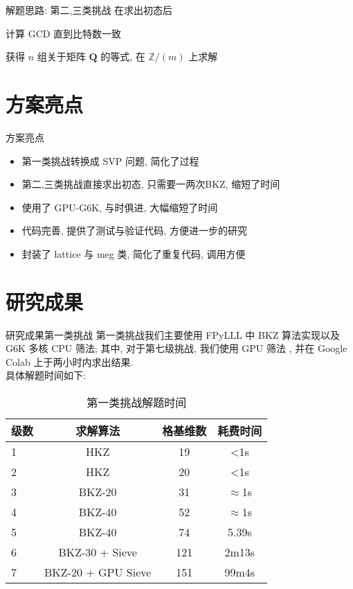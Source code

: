 \documentclass[10pt,compress]{beamer}
\newcommand{\Z}{\ensuremath{\mathbb{Z}}\xspace}
\newcommand{\mat}[1]{\mathbf{#1}\xspace}
\begin{document}
\begin{frame}{解题思路: 第二,三类挑战}
  在求出初态后 \\
  \begin{description}
    \pause
    \item[求模数 $m$] 计算 GCD 直到比特数一致
    \pause 
    \item[求系数 $c_i$] 获得 $n$ 组关于矩阵 $\mat{Q}$ 的等式, 在 $\Z / (m)$ 上求解
  \end{description}
\end{frame}



\section{方案亮点}

\begin{frame}{方案亮点}
  \begin{itemize}
    \pause
    \item 第一类挑战转换成 SVP 问题, 简化了过程
    \pause
    \item 第二,三类挑战直接求出初态, 只需要一两次BKZ, 缩短了时间
    \pause
    \item 使用了 GPU-G6K, 与时俱进, 大幅缩短了时间
    \pause
    \item 代码完善, 提供了测试与验证代码, 方便进一步的研究
    \pause
    \item 封装了 lattice 与 meg 类, 简化了重复代码, 调用方便
  \end{itemize}
\end{frame}



\section{研究成果}

\begin{frame}{研究成果}{第一类挑战}
  第一类挑战我们主要使用 FPyLLL \cite{fpylll} 中 BKZ 算法实现以及 G6K \cite{Albrecht2019a} 多核 CPU 筛法;
  \pause
  其中, 对于第七级挑战, 我们使用 GPU 筛法 \cite{Ducas2021}, 并在 Google Colab 上于两小时内求出结果. \\
  \pause
  具体解题时间如下:
  \begin{table}
    \begin{tabular}{l | c | c | c }
      级数 &求解算法 &格基维数 &耗费时间 \\
      \hline \hline
      1 &HKZ &19 &<1s \\
      2 &HKZ &20 &<1s \\
      3 &BKZ-20 &31 &$\approx$1s \\
      4 &BKZ-40 &52 &$\approx$1s \\
      5 &BKZ-40 &74 &5.39s \\
      6 &BKZ-30 + Sieve &121 &2m13s \\
      7 &BKZ-20 + GPU Sieve &151 &99m4s
    \end{tabular}
    \caption{第一类挑战解题时间}
  \end{table}
\end{frame}
\end{document}
